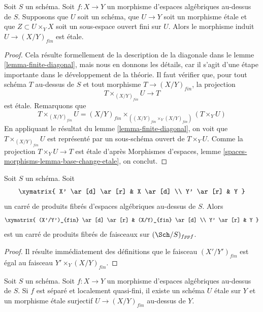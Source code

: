 \begin{lemma}
\label{lemma-finite-criterion-etale}
Soit $S$ un schéma.
Soit $f : X \to Y$ un morphisme d'espaces algébriques au-dessus de $S$.
Supposons que $U$ soit un schéma, que $U \to Y$ soit un morphisme étale et que
$Z \subset U \times_Y X$ soit un sous-espace ouvert fini sur $U$.
Alors le morphisme induit $U \to (X/Y)_{fin}$ est étale.
\end{lemma}

\begin{proof}
Cela résulte formellement de la description de la diagonale dans le
lemme \ref{lemma-finite-diagonal},
mais nous en donnons les détails, car il s'agit d'une étape importante dans le
développement de la théorie. Il faut vérifier que, pour tout schéma $T$ au-dessus de $S$ et tout morphisme
$T \to (X/Y)_{fin}$, la projection
$$
T \times_{(X/Y)_{fin}} U \longrightarrow T
$$
est étale. Remarquons que
$$
T \times_{(X/Y)_{fin}} U
=
(X/Y)_{fin} \times_{((X/Y)_{fin} \times_Y (X/Y)_{fin})} (T \times_Y U)
$$
En appliquant le résultat du
lemme \ref{lemma-finite-diagonal},
on voit que $T \times_{(X/Y)_{fin}} U$ est représenté par un sous-schéma ouvert de
$T \times_Y U$. Comme la projection $T \times_Y U \to T$ est étale d'après
Morphismes d'espaces, lemme \ref{spaces-morphisms-lemma-base-change-etale},
on conclut.
\end{proof}

\begin{lemma}
\label{lemma-finite-pullback}
Soit $S$ un schéma.
Soit
$$
\xymatrix{
X' \ar[d] \ar[r] & X \ar[d] \\
Y' \ar[r] & Y
}
$$
un carré de produits fibrés d'espaces algébriques au-dessus de $S$. Alors
$$
\xymatrix{
(X'/Y')_{fin} \ar[d] \ar[r] & (X/Y)_{fin} \ar[d] \\
Y' \ar[r] & Y
}
$$
est un carré de produits fibrés de faisceaux sur $(\Sch/S)_{fppf}$.
\end{lemma}

\begin{proof}
Il résulte immédiatement des définitions que
le faisceau $(X'/Y')_{fin}$ est égal au faisceau
$Y' \times_Y (X/Y)_{fin}$.
\end{proof}

\begin{lemma}
\label{lemma-finite-surjective-etale-cover}
Soit $S$ un schéma.
Soit $f : X \to Y$ un morphisme d'espaces algébriques au-dessus de $S$.
Si $f$ est séparé et localement quasi-fini, il existe un
schéma $U$ étale sur $Y$ et un morphisme étale surjectif
$U \to (X/Y)_{fin}$ au-dessus de $Y$.
\end{lemma}

